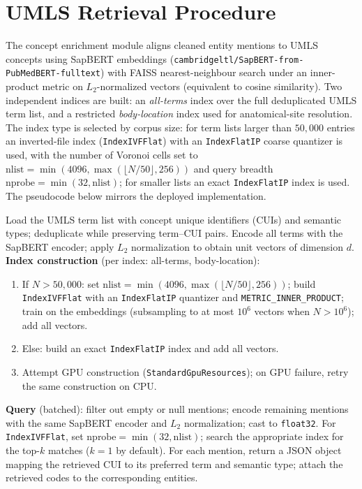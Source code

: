 \section{UMLS Retrieval Procedure}

The concept enrichment module aligns cleaned entity mentions to UMLS concepts using SapBERT embeddings (\nolinkurl{cambridgeltl/SapBERT-from-PubMedBERT-fulltext}) with FAISS nearest-neighbour search under an inner-product metric on \(L_2\)-normalized vectors (equivalent to cosine similarity). Two independent indices are built: an \emph{all-terms} index over the full deduplicated UMLS term list, and a restricted \emph{body-location} index used for anatomical-site resolution. The index type is selected by corpus size: for term lists larger than $50{,}000$ entries an inverted-file index (\texttt{IndexIVFFlat}) with an \texttt{IndexFlatIP} coarse quantizer is used, with the number of Voronoi cells set to $\text{nlist}=\min(4096, \max(\lfloor N/50\rfloor, 256))$ and query breadth $\text{nprobe}=\min(32, \text{nlist})$; for smaller lists an exact \texttt{IndexFlatIP} index is used. The pseudocode below mirrors the deployed implementation.

\begin{algorithm}[H]
\caption{UMLS Concept Retrieval with SapBERT and FAISS}
\begin{algorithmic}[1]
\STATE Load the UMLS term list with concept unique identifiers (CUIs) and semantic types; deduplicate while preserving term--CUI pairs.
\STATE Encode all terms with the SapBERT encoder; apply $L_2$ normalization to obtain unit vectors of dimension $d$.
\STATE \textbf{Index construction} (per index: all-terms, body-location):
    \begin{enumerate}[label*=\arabic*.]
    \item If $N > 50{,}000$: set $\text{nlist}=\min(4096, \max(\lfloor N/50\rfloor, 256))$; build \texttt{IndexIVFFlat} with an \texttt{IndexFlatIP} quantizer and \texttt{METRIC\_INNER\_PRODUCT}; train on the embeddings (subsampling to at most $10^6$ vectors when $N>10^6$); add all vectors.
    \item Else: build an exact \texttt{IndexFlatIP} index and add all vectors.
    \item Attempt GPU construction (\texttt{StandardGpuResources}); on GPU failure, retry the same construction on CPU.
    \end{enumerate}
\STATE \textbf{Query} (batched): filter out empty or null mentions; encode remaining mentions with the same SapBERT encoder and $L_2$ normalization; cast to \texttt{float32}.
\STATE For \texttt{IndexIVFFlat}, set $\text{nprobe}=\min(32, \text{nlist})$; search the appropriate index for the top-$k$ matches ($k=1$ by default).
\STATE For each mention, return a JSON object mapping the retrieved CUI to its preferred term and semantic type; attach the retrieved codes to the corresponding entities.
\end{algorithmic}
\end{algorithm}

